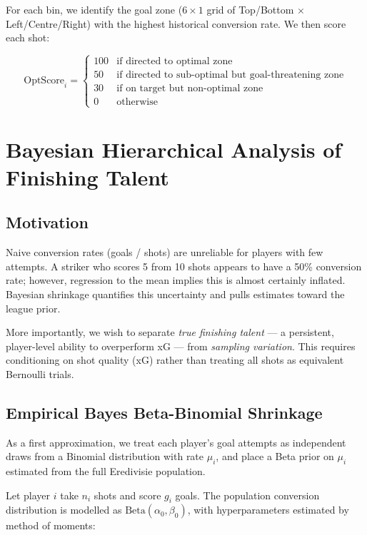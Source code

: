 \documentclass[12pt,a4paper]{article}
\begin{document}
For each bin, we identify the goal zone ($6 \times 1$ grid of Top/Bottom $\times$ Left/Centre/Right) with the highest historical conversion rate. We then score each shot:

\begin{equation}
\text{OptScore}_i =
\begin{cases}
100 & \text{if directed to optimal zone} \\
50  & \text{if directed to sub-optimal but goal-threatening zone} \\
30  & \text{if on target but non-optimal zone} \\
0   & \text{otherwise}
\end{cases}
\end{equation}

\section{Bayesian Hierarchical Analysis of Finishing Talent}
\label{sec:bayes}

\subsection{Motivation}

Naive conversion rates (goals / shots) are unreliable for players with few attempts. A striker who scores 5 from 10 shots appears to have a 50\% conversion rate; however, regression to the mean implies this is almost certainly inflated. Bayesian shrinkage quantifies this uncertainty and pulls estimates toward the league prior.

More importantly, we wish to separate \emph{true finishing talent} --- a persistent, player-level ability to overperform xG --- from \emph{sampling variation}. This requires conditioning on shot quality (xG) rather than treating all shots as equivalent Bernoulli trials.

\subsection{Empirical Bayes Beta-Binomial Shrinkage}
\label{sec:eb}

As a first approximation, we treat each player's goal attempts as independent draws from a Binomial distribution with rate $\mu_i$, and place a Beta prior on $\mu_i$ estimated from the full Eredivisie population.

Let player $i$ take $n_i$ shots and score $g_i$ goals. The population conversion distribution is modelled as $\text{Beta}(\alpha_0, \beta_0)$, with hyperparameters estimated by method of moments:
\end{document}
